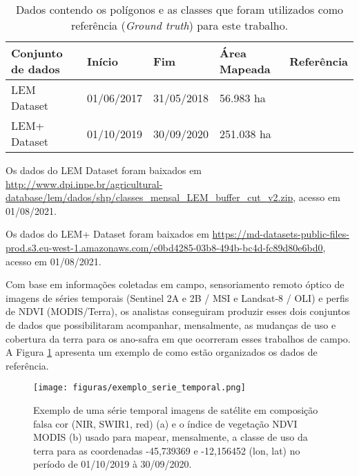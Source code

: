 \begin{table}[H]
\caption{Dados contendo os polígonos e as classes que foram utilizados como referência (\textit{Ground truth}) para este trabalho.}
\label{tab:conjunto_de_dados}
\begin{adjustbox}{width=\textwidth}
\begin{tabular}{|l|l|l|l|l|}
\hline
Conjunto de dados & Início     & Fim        & Área Mapeada & Referência \\ \hline
LEM Dataset       & 01/06/2017 & 31/05/2018 & 56.983 ha    & \cite{sanches2018lem} \\ \hline
LEM+ Dataset      & 01/10/2019 & 30/09/2020 & 251.038 ha   & \cite{oldoni2020lem}  \\ \hline
\end{tabular}
\end{adjustbox}
\begin{tablenotes}
\item[1] Os dados do LEM Dataset foram baixados em \url{http://www.dpi.inpe.br/agricultural-database/lem/dados/shp/classes_mensal_LEM_buffer_cut_v2.zip}, acesso em 01/08/2021. \\
\item[2] Os dados do LEM+ Dataset foram baixados em \url{https://md-datasets-public-files-prod.s3.eu-west-1.amazonaws.com/e0bd4285-03b8-494b-bc4d-fc89d80e6bd0}, acesso em 01/08/2021.
\end{tablenotes}
\end{table}

Com base em informações coletadas em campo, sensoriamento remoto óptico de imagens de séries temporais (Sentinel 2A e 2B / MSI e Landsat-8 / OLI) e perfis de NDVI (MODIS/Terra), os analistas conseguiram produzir esses dois conjuntos de dados que possibilitaram acompanhar, mensalmente, as mudanças de uso e cobertura da terra para os ano-safra em que ocorreram esses trabalhos de campo. A Figura \ref{fig:serie_imagens_exemplo_lemdataset} apresenta um exemplo de como estão organizados os dados de referência.  

\begin{figure}[H]
    \centering
    \caption{Exemplo de uma série temporal imagens de satélite em composição falsa cor (NIR, SWIR1, red) (a) e o índice de vegetação NDVI MODIS (b) usado para mapear, mensalmente, a classe de uso da terra  para as coordenadas -45,739369 e -12,156452 (lon, lat) no período de 01/10/2019 à 30/09/2020.}
    \label{fig:serie_imagens_exemplo_lemdataset}
    \texttt{[image: figuras/exemplo\_serie\_temporal.png]}
\end{figure}


